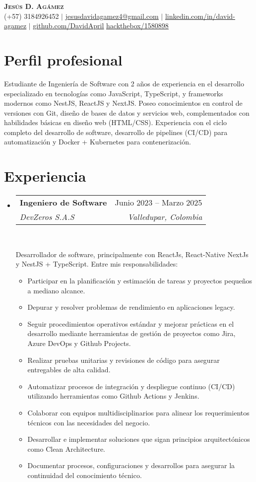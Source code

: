 \documentclass[letterpaper,11pt]{article}
\makeatletter
\newcommand{\resumeItem}[1]{
  \item\small{
    {#1 \vspace{-2pt}}
  }
}
\newcommand{\resumeSubheading}[4]{
  \vspace{-2pt}\item
    \begin{tabular*}{0.97\textwidth}[t]{l@{\extracolsep{\fill}}r}
      \textbf{#1} & #2 \\
      \textit{\small#3} & \textit{\small #4} \\
    \end{tabular*}\vspace{-7pt}
}
\newcommand{\resumeSubHeadingListStart}{\begin{itemize}[leftmargin=0.15in, label={}]}
\newcommand{\resumeSubHeadingListEnd}{\end{itemize}}
\newcommand{\resumeItemListStart}{\begin{itemize}}
\newcommand{\resumeItemListEnd}{\end{itemize}\vspace{-5pt}}
\makeatother
\begin{document}
\begin{center}
    \textbf{\Huge \scshape Jesús D. Agámez} \\ \vspace{1pt}
    \small (+57) 3184926452 $|$ \href{mailto:jesusdavidagamez4@gmail.com}{\underline{jesusdavidagamez4@gmail.com}} $|$ 
    \href{https://linkedin.com/in/david-agamez}{\underline{linkedin.com/in/david-agamez}} $|$
    \href{https://github.com/DavidApril}{\underline{github.com/DavidApril}}
    \href{https://app.hackthebox.com/profile/1580898}{\underline{hackthebox/1580898}}
\end{center}

\section{Perfil profesional}
    \par
    {Estudiante de Ingeniería de Software con 2 años de experiencia en el desarrollo especializado en tecnologías como JavaScript, TypeScript, y frameworks modernos como NestJS, ReactJS y NextJS. Poseo conocimientos en control de versiones con Git, diseño de bases de datos y servicios web, complementados con habilidades básicas en diseño web (HTML/CSS). Experiencia con el ciclo completo del desarrollo de software, desarrollo de pipelines (CI/CD) para automatización y Docker + Kubernetes para contenerización.}


\section{Experiencia}
  \resumeSubHeadingListStart
    \resumeSubheading
      {Ingeniero de Software}{Junio 2023 -- Marzo 2025}
      {DevZeros S.A.S}{Valledupar, Colombia}
      \
      \par{Desarrollador de software, principalmente con ReactJs, React-Native NextJs y NestJS  + TypeScript. Entre mis
      responsabilidades:}
    
      \resumeItemListStart
        \resumeItem{Participar en la planificación y estimación de tareas y proyectos pequeños a mediano alcance.}
        \resumeItem{Depurar y resolver problemas de rendimiento en aplicaciones legacy.}
        \resumeItem{Seguir procedimientos operativos estándar y mejorar prácticas en el desarrollo mediante herramientas de gestión de proyectos como Jira, Azure DevOps y Github Projects.}
        \resumeItem{Realizar pruebas unitarias y revisiones de código para asegurar entregables de alta calidad.}
        \resumeItem{Automatizar procesos de integración y despliegue continuo (CI/CD) utilizando herramientas como Github Actions y Jenkins.}
        \resumeItem{Colaborar con equipos multidisciplinarios para alinear los requerimientos técnicos con las necesidades del negocio.}
        \resumeItem{Desarrollar e implementar soluciones que sigan principios arquitectónicos como Clean Architecture.}
        \resumeItem{Documentar procesos, configuraciones y desarrollos para asegurar la continuidad del conocimiento técnico.}
      \resumeItemListEnd
    \resumeSubHeadingListEnd
\end{document}
